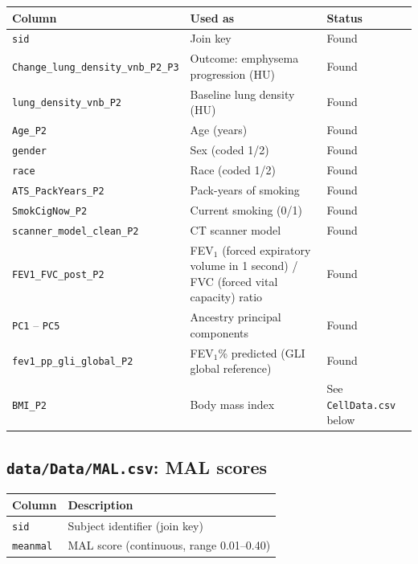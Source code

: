 \documentclass[11pt, letterpaper]{article}
\begin{document}
\begin{tabular}{lll}
\toprule
Column & Used as & Status \\
\midrule
\texttt{sid}                          & Join key            & Found \\
\texttt{Change\_lung\_density\_vnb\_P2\_P3} & Outcome: emphysema progression (HU) & Found \\
\texttt{lung\_density\_vnb\_P2}       & Baseline lung density (HU)  & Found \\
\texttt{Age\_P2}                      & Age (years)                 & Found \\
\texttt{gender}                       & Sex (coded 1/2)             & Found \\
\texttt{race}                         & Race (coded 1/2)            & Found \\
\texttt{ATS\_PackYears\_P2}           & Pack-years of smoking       & Found \\
\texttt{SmokCigNow\_P2}               & Current smoking (0/1)       & Found \\
\texttt{scanner\_model\_clean\_P2}    & CT scanner model            & Found \\
\texttt{FEV1\_FVC\_post\_P2}          & FEV$_1$ (forced expiratory volume in 1 second) / FVC (forced vital capacity) ratio & Found \\
\texttt{PC1} -- \texttt{PC5}          & Ancestry principal components & Found \\
\texttt{fev1\_pp\_gli\_global\_P2}      & FEV$_1$\% predicted (GLI global reference) & Found \\
\texttt{BMI\_P2}                      & Body mass index             & See \texttt{CellData.csv} below \\
\bottomrule
\end{tabular}

\subsection*{\texttt{data/Data/MAL.csv}: MAL scores}

\begin{tabular}{ll}
\toprule
Column & Description \\
\midrule
\texttt{sid}      & Subject identifier (join key) \\
\texttt{meanmal}  & MAL score (continuous, range 0.01--0.40) \\
\bottomrule
\end{tabular}
\end{document}
